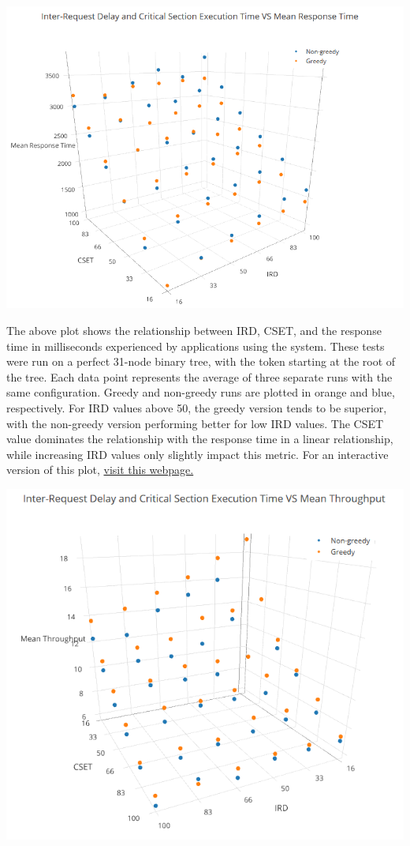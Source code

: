 \documentclass{article}
\begin{document}
\begin{center}
    \includegraphics[width=\textwidth]{figs/IRDCSETvsMRT} \\
\end{center}

The above plot shows the relationship between IRD, CSET, and the response time in milliseconds experienced by applications using the system. These tests were run on a perfect 31-node binary tree, with the token starting at the root of the tree. Each data point represents the average of three separate runs with the same configuration. Greedy and non-greedy runs are plotted in orange and blue, respectively. For IRD values above 50, the greedy version tends to be superior, with the non-greedy version performing better for low IRD values. The CSET value dominates the relationship with the response time in a linear relationship, while increasing IRD values only slightly impact this metric. For an interactive version of this plot, \href{https://plot.ly/~tgduckworth/5/}{visit this webpage.}

\begin{center}
    \includegraphics[width=\textwidth]{figs/IRDCSETvsMT} \\
\end{center}
\end{document}
